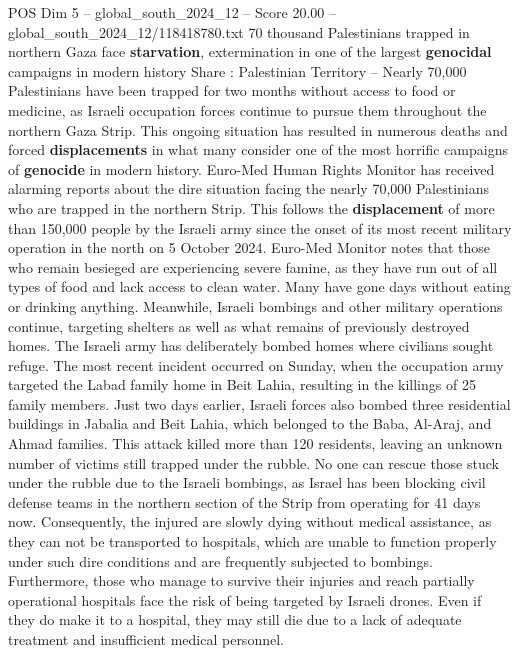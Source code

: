 \begin{textsample}{POS Dim 5 – global\_south\_2024\_12 – Score 20.00 – global\_south\_2024\_12/118418780.txt}  \label{ex:f5_pos_042}
70 thousand Palestinians trapped in northern Gaza face \textbf{starvation}, extermination in one of the largest \textbf{genocidal} campaigns in modern history Share : Palestinian Territory -- Nearly 70,000 Palestinians have been trapped for two months without access to food or medicine, as Israeli occupation forces continue to pursue them throughout the northern Gaza Strip.
This ongoing situation has resulted in numerous deaths and forced \textbf{displacements} in what many consider one of the most horrific campaigns of \textbf{genocide} in modern history.
Euro-Med Human Rights Monitor has received alarming reports about the dire situation facing the nearly 70,000 Palestinians who are trapped in the northern Strip.
This follows the \textbf{displacement} of more than 150,000 people by the Israeli army since the onset of its most recent military operation in the north on 5 October 2024.
Euro-Med Monitor notes that those who remain besieged are experiencing severe famine, as they have run out of all types of food and lack access to clean water.
Many have gone days without eating or drinking anything.
Meanwhile, Israeli bombings and other military operations continue, targeting shelters as well as what remains of previously destroyed homes.
The Israeli army has deliberately bombed homes where civilians sought refuge.
The most recent incident occurred on Sunday, when the occupation army targeted the Labad family home in Beit Lahia, resulting in the killings of 25 family members.
Just two days earlier, Israeli forces also bombed three residential buildings in Jabalia and Beit Lahia, which belonged to the Baba, Al-Araj, and Ahmad families.
This attack killed more than 120 residents, leaving an unknown number of victims still trapped under the rubble.
No one can rescue those stuck under the rubble due to the Israeli bombings, as Israel has been blocking civil defense teams in the northern section of the Strip from operating for 41 days now.
Consequently, the injured are slowly dying without medical assistance, as they can not be transported to hospitals, which are unable to function properly under such dire conditions and are frequently subjected to bombings.
Furthermore, those who manage to survive their injuries and reach partially operational hospitals face the risk of being targeted by Israeli drones.
Even if they do make it to a hospital, they may still die due to a lack of adequate treatment and insufficient medical personnel.

\end{textsample}
